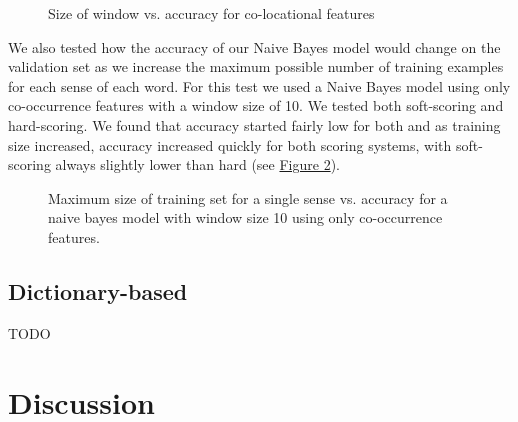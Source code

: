 \documentclass{article}
\begin{document}
\begin{figure}[h]\label{fig:col}
\centering
{}
\caption{Size of window vs. accuracy for co-locational features}
\end{figure}

We also tested how the accuracy of our Naive Bayes model would change on the validation set as we increase the maximum possible number of training examples for each sense of each word. For this test we used a Naive Bayes model using only co-occurrence features with a window size of 10. We tested both soft-scoring and hard-scoring. We found that accuracy started fairly low for both and as training size increased, accuracy increased quickly for both scoring systems, with soft-scoring always slightly lower than hard (see \hyperref[fig:size]{Figure 2}).

\begin{figure}[h]\label{fig:size}
\centering
{}
\caption{Maximum size of training set for a single sense vs. accuracy for a naive bayes model with window size 10 using only co-occurrence features.}
\end{figure}

\subsection{Dictionary-based}

TODO

\section{Discussion}
\end{document}
